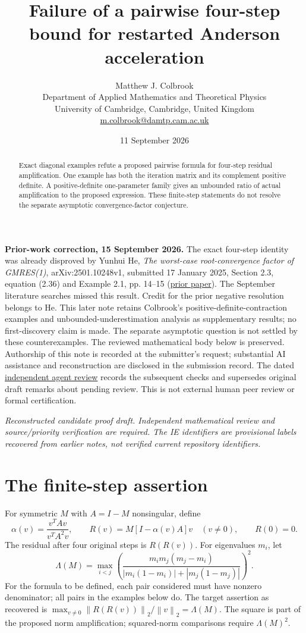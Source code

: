 \documentclass[11pt]{article}
\title{Failure of a pairwise four-step bound for restarted Anderson acceleration}
\author{Matthew J. Colbrook\\\small Department of Applied Mathematics and Theoretical Physics\\\small University of Cambridge, Cambridge, United Kingdom\\\small\href{mailto:m.colbrook@damtp.cam.ac.uk}{m.colbrook@damtp.cam.ac.uk}}
\date{11 September 2026}
\newcommand{\norm}[1]{\left\lVert#1\right\rVert}
\begin{document}
\maketitle

\noindent\textbf{Prior-work correction, 15 September 2026.} The exact four-step identity was already disproved by Yunhui He, \emph{The worst-case root-convergence factor of GMRES(1)}, arXiv:2501.10248v1, submitted 17 January 2025, Section 2.3, equation (2.36) and Example 2.1, pp. 14--15 (\href{https://arxiv.org/pdf/2501.10248v1}{prior paper}). The September literature searches missed this result. Credit for the prior negative resolution belongs to He. This later note retains Colbrook's positive-definite-contraction examples and unbounded-underestimation analysis as supplementary results; no first-discovery claim is made. The separate asymptotic question is not settled by these counterexamples. The reviewed mathematical body below is preserved. Authorship of this note is recorded at the submitter's request; substantial AI assistance and reconstruction are disclosed in the submission record.
The dated \href{https://github.com/MColbrook/OpenProblemsInNLA/blob/codex/colbrook-recovered-submissions/references/colbrook-recovered-2026-09-11/verification/reviews/IE-18-review.md}{independent agent review} records the subsequent checks and supersedes original draft remarks about pending review. This is not external human peer review or formal certification.
\par\medskip

\noindent\textit{Reconstructed candidate proof draft. Independent mathematical review and source/priority verification are required. The IE identifiers are provisional labels recovered from earlier notes, not verified current repository identifiers.}


\begin{abstract}
Exact diagonal examples refute a proposed pairwise formula for four-step residual amplification. One example has both the iteration matrix and its complement positive definite. A positive-definite one-parameter family gives an unbounded ratio of actual amplification to the proposed expression. These finite-step statements do not resolve the separate asymptotic convergence-factor conjecture.
\end{abstract}
\section{The finite-step assertion}
For symmetric $M$ with $A=I-M$ nonsingular, define
\[
\alpha(v)=\frac{v^TAv}{v^TA^2v},\qquad R(v)=M[I-\alpha(v)A]v\quad(v\ne0),\qquad R(0)=0.
\]
The residual after four original steps is $R(R(v))$. For eigenvalues $m_i$, let
\[
\Lambda(M)=\max_{i<j}\left(\frac{m_im_j(m_j-m_i)}{|m_i(1-m_i)|+|m_j(1-m_j)|}\right)^2.
\]
For the formula to be defined, each pair considered must have nonzero denominator; all pairs in the examples below do. The target assertion as recovered is $\max_{v\ne0}\norm{R(R(v))}_2/\norm v_2=\Lambda(M)$. The square is part of the proposed norm amplification; squared-norm comparisons require $\Lambda(M)^2$.
\end{document}
